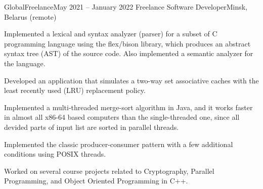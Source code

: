 

\begin{cvHeadingList}

  \cvCustomHeading
    {GlobalFreelance}{May 2021 – January 2022}
    {Freelance Software Developer}{Minsk, Belarus (remote)} %

  \begin{cvList}
    \cvItem Implemented a lexical and syntax analyzer (parser) for a subset of
      C programming language using the flex/bison library, which produces an
      abstract syntax tree (AST) of the source code. Also implemented a semantic
      analyzer for the language.

    \cvItem Developed an application that simulates a two-way set associative
      caches with the least recently used (LRU) replacement policy.

    \cvItem Implemented a multi-threaded merge-sort algorithm in Java, and it
      works faster in almost all x86-64 based computers than the single-threaded
      one, since all devided parts of input list are sorted in parallel threads.

    \cvItem Implemented the classic producer-consumer pattern with a few
      additional conditions using POSIX threads.

    \cvItem Worked on several course projects related to Cryptography, Parallel
      Programming, and Object Oriented Programming in C++.
  \end{cvList}

\end{cvHeadingList}
